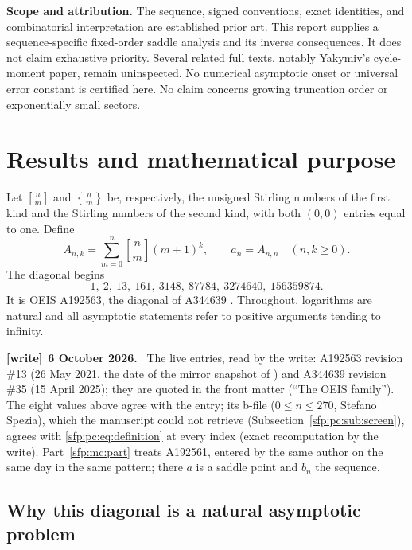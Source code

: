 \documentclass[11pt,letterpaper]{article}
\numberwithin{equation}{section}
\theoremstyle{definition}\newtheorem{definition}[theorem]{Definition}
\theoremstyle{remark}\newtheorem{remark}[theorem]{Remark}
\newcommand{\sone}[2]{\genfrac{[}{]}{0pt}{}{#1}{#2}}
\newcommand{\stwo}[2]{\genfrac{\{} {\}}{0pt}{}{#1}{#2}}
\newenvironment{writenote}[1][]{\par\smallskip\begingroup\small
 \noindent\textbf{[write]}\if\relax\detokenize{#1}\relax\else~\textbf{#1.}\fi\ }%
 {\par\endgroup\smallskip}
\begin{document}
\noindent\textbf{Scope and attribution.}
The sequence, signed conventions, exact identities, and combinatorial
interpretation are established prior art. This report supplies a
sequence-specific fixed-order saddle analysis and its inverse
consequences. It does not claim exhaustive priority. Several related
full texts, notably Yakymiv's cycle-moment paper, remain uninspected.
No numerical asymptotic onset or universal error constant is certified
here. No claim concerns growing truncation order or exponentially
small sectors.
\medskip


\section{Results and mathematical purpose}\label{sfp:pc:sec:results}

Let $\sone nm$ and $\stwo nm$ be, respectively, the unsigned
Stirling numbers of the first kind and the Stirling numbers of the
second kind, with both $(0,0)$ entries equal to one. Define
\begin{equation}\label{sfp:pc:eq:definition}
 A_{n,k}=\sum_{m=0}^n\sone nm(m+1)^k,
 \qquad a_n=A_{n,n}\quad(n,k\geq0).
\end{equation}
The diagonal begins
\[
1,\ 2,\ 13,\ 161,\ 3148,\ 87784,\ 3274640,\ 156359874.
\]
It is OEIS A192563, the diagonal of A344639
\cite{oeisdiag,oeisarray}. Throughout, logarithms are natural and
all asymptotic statements refer to positive arguments tending to
infinity.

\begin{writenote}[6 October 2026]
The live entries, read by the write: A192563 revision \#13 (26 May 2021, the date of the mirror snapshot of \cite{oeisdiag}) and A344639 revision \#35 (15 April 2025); they are quoted in the front matter (``The OEIS family''). The eight values above agree with the entry; its b-file ($0\le n\le270$, Stefano Spezia), which the manuscript could not retrieve (Subsection~\ref{sfp:pc:sub:screen}), agrees with \eqref{sfp:pc:eq:definition} at every index (exact recomputation by the write). Part~\ref{sfp:mc:part} treats A192561, entered by the same author on the same day in the same pattern; there $a$ is a saddle point and $b_n$ the sequence.
\end{writenote}

\subsection{Why this diagonal is a natural asymptotic problem}
\end{document}
